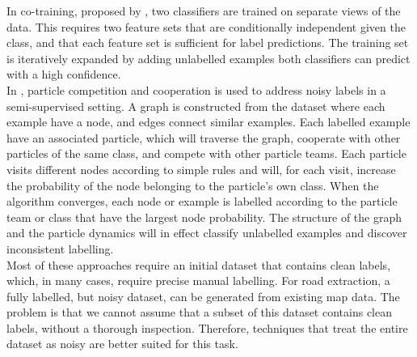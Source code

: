 In co-training, proposed by \cite{Blum_co-training}, two classifiers are trained on separate views of the data. This requires two feature sets that are conditionally independent given the class, and that each feature set is sufficient for label predictions. The training set is iteratively expanded by adding unlabelled examples both classifiers can predict with a high confidence. \\

In \citep{Breve_particle}, particle competition and cooperation is used to address noisy labels in a semi-supervised setting. A graph is constructed from the dataset where each example have a node, and edges connect similar examples. Each labelled example have an associated particle, which will traverse the graph, cooperate with other particles of the same class, and compete with other particle teams. Each particle visits different nodes according to simple rules and will, for each visit, increase the probability of the node belonging to the particle's own class. When the algorithm converges, each node or example is labelled according to the particle team or class that have the largest node probability. The structure of the graph and the particle dynamics will in effect classify unlabelled examples and discover inconsistent labelling. \\

Most of these approaches require an initial dataset that contains clean labels, which, in many cases, require precise manual labelling. For road extraction, a fully labelled, but noisy dataset, can be generated from existing map data. The problem is that we cannot assume that a subset of this dataset contains clean labels, without a thorough inspection. Therefore, techniques that treat the entire dataset as noisy are better suited for this task. 


